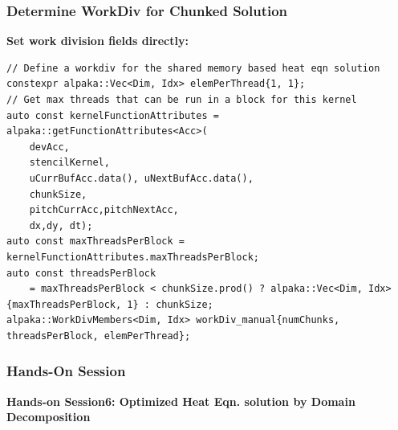 \documentclass[9pt]{beamer}
\begin{document}
\begin{frame}[fragile]
\frametitle{Determine WorkDiv for Chunked Solution}

\textbf{Set work division fields directly:}
\lstset{basicstyle=\ttfamily\scriptsize}
\begin{lstlisting}
// Define a workdiv for the shared memory based heat eqn solution
constexpr alpaka::Vec<Dim, Idx> elemPerThread{1, 1};
// Get max threads that can be run in a block for this kernel
auto const kernelFunctionAttributes = alpaka::getFunctionAttributes<Acc>(
    devAcc,
    stencilKernel,
    uCurrBufAcc.data(), uNextBufAcc.data(),
    chunkSize,
    pitchCurrAcc,pitchNextAcc,
    dx,dy, dt);
auto const maxThreadsPerBlock = kernelFunctionAttributes.maxThreadsPerBlock;
auto const threadsPerBlock
    = maxThreadsPerBlock < chunkSize.prod() ? alpaka::Vec<Dim, Idx>{maxThreadsPerBlock, 1} : chunkSize;
alpaka::WorkDivMembers<Dim, Idx> workDiv_manual{numChunks, threadsPerBlock, elemPerThread};
\end{lstlisting}
\end{frame}

\begin{frame}
\frametitle{Hands-On Session}
\begin{center}
      \Huge \textbf{Hands-on Session6: Optimized Heat Eqn. solution by Domain Decomposition}
  \end{center}
\end{frame}

\end{document}
